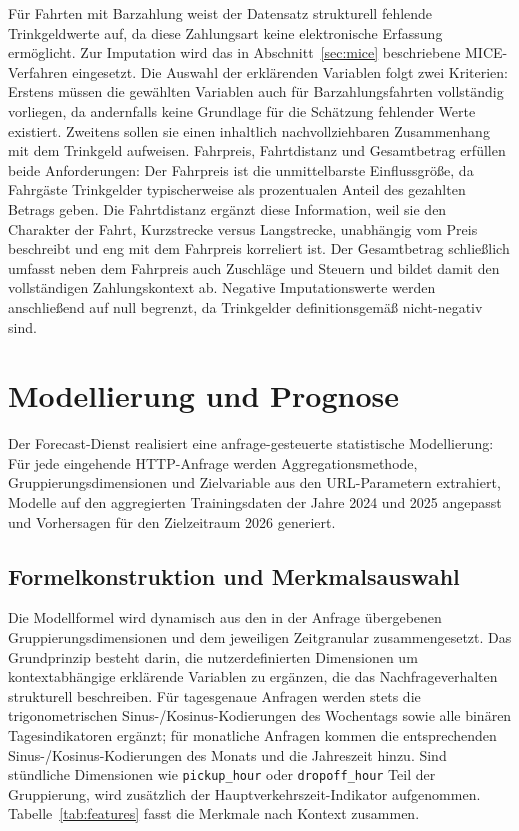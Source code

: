 Für Fahrten mit Barzahlung weist der Datensatz strukturell fehlende Trinkgeldwerte auf, da diese Zahlungsart keine elektronische Erfassung ermöglicht. Zur Imputation wird das in Abschnitt~\ref{sec:mice} beschriebene MICE-Verfahren eingesetzt. Die Auswahl der erklärenden Variablen folgt zwei Kriterien: Erstens müssen die gewählten Variablen auch für Barzahlungsfahrten vollständig vorliegen, da andernfalls keine Grundlage für die Schätzung fehlender Werte existiert. Zweitens sollen sie einen inhaltlich nachvollziehbaren Zusammenhang mit dem Trinkgeld aufweisen. Fahrpreis, Fahrtdistanz und Gesamtbetrag erfüllen beide Anforderungen: Der Fahrpreis ist die unmittelbarste Einflussgröße, da Fahrgäste Trinkgelder typischerweise als prozentualen Anteil des gezahlten Betrags geben. Die Fahrtdistanz ergänzt diese Information, weil sie den Charakter der Fahrt, Kurzstrecke versus Langstrecke, unabhängig vom Preis beschreibt und eng mit dem Fahrpreis korreliert ist. Der Gesamtbetrag schließlich umfasst neben dem Fahrpreis auch Zuschläge und Steuern und bildet damit den vollständigen Zahlungskontext ab. Negative Imputationswerte werden anschließend auf null begrenzt, da Trinkgelder definitionsgemäß nicht-negativ sind.

\section{Modellierung und Prognose}

Der Forecast-Dienst realisiert eine anfrage-gesteuerte statistische Modellierung: Für jede eingehende HTTP-Anfrage werden Aggregationsmethode, Gruppierungsdimensionen und Zielvariable aus den URL-Parametern extrahiert, Modelle auf den aggregierten Trainingsdaten der Jahre 2024 und 2025 angepasst und Vorhersagen für den Zielzeitraum 2026 generiert.

\subsection{Formelkonstruktion und Merkmalsauswahl}

Die Modellformel wird dynamisch aus den in der Anfrage übergebenen Gruppierungsdimensionen und dem jeweiligen Zeitgranular zusammengesetzt. Das Grundprinzip besteht darin, die nutzerdefinierten Dimensionen um kontextabhängige erklärende Variablen zu ergänzen, die das Nachfrageverhalten strukturell beschreiben. Für tagesgenaue Anfragen werden stets die trigonometrischen Sinus-/Kosinus-Kodierungen des Wochentags sowie alle binären Tagesindikatoren ergänzt; für monatliche Anfragen kommen die entsprechenden Sinus-/Kosinus-Kodierungen des Monats und die Jahreszeit hinzu. Sind stündliche Dimensionen wie \texttt{pickup\_hour} oder \texttt{dropoff\_hour} Teil der Gruppierung, wird zusätzlich der Hauptverkehrszeit-Indikator aufgenommen. Tabelle~\ref{tab:features} fasst die Merkmale nach Kontext zusammen.

